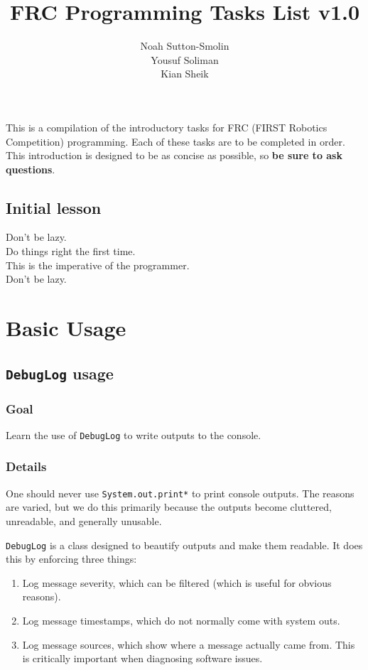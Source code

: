 \documentclass[a4paper]{article}
\title{FRC Programming Tasks List v1.0}
\author{Noah Sutton-Smolin\\Yousuf Soliman\\Kian Sheik}
\begin{document}
\setcounter{tocdepth}{2}\maketitle\tableofcontents\pagebreak

This is a compilation of the introductory tasks for FRC (FIRST Robotics Competition) programming. Each of these tasks are to be completed in order. This introduction is designed to be as concise as possible, so \textbf{be sure to ask questions}.

\subsection{Initial lesson}
Don't be lazy.\\Do things right the first time.\\This is the imperative of the programmer.\\Don't be lazy.

\section{Basic Usage}
\subsection{\lstinline{DebugLog} usage}
\subsubsection{Goal} Learn the use of \lstinline{DebugLog} to write outputs to the console.
\subsubsection{Details} One should never use \lstinline{System.out.print*} to print console outputs. The reasons are varied, but we do this primarily because the outputs become cluttered, unreadable, and generally unusable. 

\lstinline{DebugLog} is a class designed to beautify outputs and make them readable. It does this by enforcing three things:
\begin{enumerate}\item{Log message severity, which can be filtered (which is useful for obvious reasons).}\item{Log message timestamps, which do not normally come with system outs.}\item{Log message sources, which show where a message actually came from. This is critically important when diagnosing software issues.}\end{enumerate}
\end{document}
